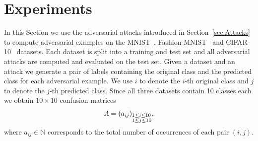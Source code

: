 \documentclass{article}
\begin{document}
%
%



\section{Experiments}\label{experiments}
In this Section we use the adversarial attacks introduced in Section~\ref{sec:Attacks} to compute adversarial examples on the MNIST~\cite{deng2012mnist}, Fashion-MNIST~\cite{deng2012mnist} and CIFAR-10~\cite{krizhevsky2009learning} datasets. Each dataset is split into a training and test set and all adversarial attacks are computed and evaluated on the test set. Given a dataset and an attack we generate a pair of labels containing the original class and the predicted class for each adversarial example. We use $i$ to denote the $i$-th original class and $j$ to denote the $j$-th predicted class. Since all three datasets contain 10 classes each we obtain $10\times10$ confusion matrices
\[A=(a_{ij})_{\begin{subarray}{l} 1\le i\le 10 \\ 1\le j\le 10\end{subarray}},\]
where $a_{ij}\in\mathbb{N}$ corresponds to the total number of occurrences of each pair $(i,j)$.
\end{document}
